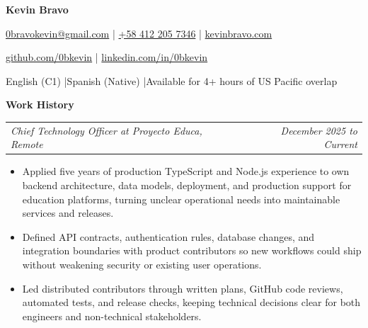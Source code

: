 \documentclass[10pt,letterpaper]{article}
\makeatletter
\newcommand{\bodyfont}{\fontsize{10.5}{15.75}\selectfont}
\newcommand{\contactfont}{\fontsize{12}{15}\selectfont}
\newcommand{\sectiontitle}[1]{%
  \vspace{4pt}
  {\bodyfont\textbf{#1}}\par
  \nopagebreak[4]
  \vspace{2pt}
}
\newcommand{\roleline}[2]{%
  \begin{tabularx}{\textwidth}{@{}Xr@{}}
    \bodyfont\textit{#1} & \bodyfont\textit{#2}
  \end{tabularx}
  \nopagebreak[4]
  \vspace{1pt}
}
\makeatother
\begin{document}
\bodyfont
\raggedright

\begin{center}
  {\fontsize{14}{17}\selectfont\textbf{Kevin Bravo}}\par
  \vspace{3pt}
  {\contactfont
    \href{mailto:0bravokevin@gmail.com}{0bravokevin@gmail.com}
    \enspace|\enspace
    \href{tel:+584122057346}{+58 412 205 7346}
    \enspace|\enspace
    \href{https://kevinbravo.com}{kevinbravo.com}
  }\par
  {\contactfont
    \href{https://github.com/0bkevin}{github.com/0bkevin}
    \enspace|\enspace
    \href{https://www.linkedin.com/in/0bkevin/}{linkedin.com/in/0bkevin}
  }\par
  {\contactfont English (C1) \enspace|\enspace Spanish (Native) \enspace|\enspace Available for 4+ hours of US Pacific overlap}
\end{center}

\sectiontitle{Work History}

\roleline{Chief Technology Officer at Proyecto Educa, Remote}{December 2025 to Current}
\begin{itemize}
  \item Applied five years of production TypeScript and Node.js experience to own backend architecture, data models, deployment, and production support for education platforms, turning unclear operational needs into maintainable services and releases.
  \item Defined API contracts, authentication rules, database changes, and integration boundaries with product contributors so new workflows could ship without weakening security or existing user operations.
  \item Led distributed contributors through written plans, GitHub code reviews, automated tests, and release checks, keeping technical decisions clear for both engineers and non-technical stakeholders.
\end{itemize}
\end{document}
